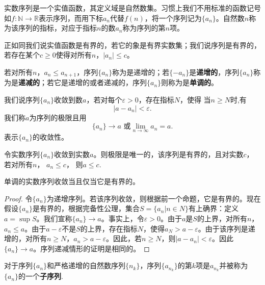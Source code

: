 \documentclass[lang=cn,newtx,10pt,scheme=chinese]{elegantbook}
\begin{document}
\begin{definition}\label{definition:实数序列/实数列}
  实数序列是一个实值函数，其定义域是自然数集。习惯上我们不用标准的函数记号如\(f:\mathbb{N}\to\mathbb{R}\)表示序列，而用下标\(a_n\)代替\(f(n)\)，将一个序列记为\(\{a_n\}\)。自然数\(n\)称为该序列的指标，对应于指标\(n\)的数\(a_n\)称为序列的第\(n\)项。
  
  正如同我们说实值函数是有界的，若它的象是有界实数集；我们说序列是有界的，若存在某个\(c\geqslant0\)使得对所有\(n\)，\(\vert a_n\vert\leqslant c\)。
  
  若对所有\(n\)，\(a_n\leqslant a_{n + 1}\)，序列\(\{a_n\}\)称为是递增的；若\(\{-a_n\}\)是\textbf{递增的}，序列\(\{a_n\}\)称为是\textbf{递减的}；若它是递增的或者递减的，序列\(\{a_n\}\)则称为是\textbf{单调的}。
\end{definition}

\begin{definition}
  我们说序列\(\{a_n\}\)收敛到数\(a\)，若对每个\(\varepsilon>0\)，存在指标\(N\)，使得
当\(n\geqslant N\)时,有\[\vert a - a_n\vert<\varepsilon.\]
我们称\(a\)为序列的极限且用
\[\{a_n\}\to a\text{ 或}\lim_{n\to\infty}a_n = a.\]
表示\(\{a_n\}\)的收敛性。
\end{definition}

\begin{proposition}[收敛的实数列的性质]\label{proposition:收敛的实数列的性质}
  令实数序列\(\{a_n\}\)收敛到实数\(a\)。则极限是唯一的，该序列是有界的，且对实数\(c\)，
若对所有\(n\)， \(a_n\leqslant c\)， 则\(a\leqslant c\).
\end{proposition}

\begin{theorem}[实数序列的单调收敛准则]\label{theorem:实数序列的单调收敛准则}
单调的实数序列收敛当且仅当它是有界的。
\end{theorem}
\begin{proof}
  令\(\{a_n\}\)为递增序列。若该序列收敛，则根据前一个命题，它是有界的。现在假设\(\{a_n\}\)是有界的，根据完备性公理，集合\(S = \{a_n|n\in N\}\)有上确界：定义\(a = \sup S\)。我们宣称\(\{a_n\}\to a\)。事实上，令\(\varepsilon>0\)。由于\(a\)是\(S\)的上界，对所有\(n\)，\(a_n\leqslant a\)。由于\(a - \varepsilon\)不是\(S\)的上界，存在指标\(N\)，使得\(a_N>a - \varepsilon\)。由于该序列是递增的，对所有\(n\geqslant N\)，\(a_n>a - \varepsilon\)。因此，若\(n\geqslant N\)，则\(\vert a - a_n\vert<\varepsilon\)。因此\(\{a_n\}\to a\)。序列递减情形的证明是相同的。
\end{proof}

\begin{definition}[子序列]\label{definition:子序列}
  对于序列\(\{a_n\}\)和严格递增的自然数序列\(\{n_k\}\)，序列\(\{a_{n_k}\}\)的第\(k\)项是\(a_{n_k}\)并被称为\(\{a_n\}\)的一个\textbf{子序列}.
\end{definition}
\end{document}
